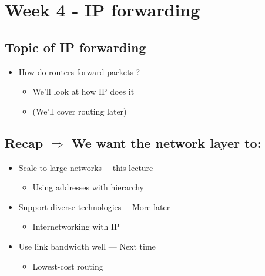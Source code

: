 \documentclass[12pt]{ctexart}   %
\begin{document}
\section{Week 4 - IP forwarding}
	\subsection{Topic of IP forwarding}
	\begin{itemize}
		\item How do routers \underline{forward} packets ?
		\begin{itemize}
			\item We'll look at how IP does it
			\item (We'll cover routing later)
		\end{itemize}
	\end{itemize}
	
	\subsection{Recap $\Rightarrow$ We want the network layer to:}
	\begin{itemize}
		\item Scale to large networks   ---this lecture
		\begin{itemize}
			\item Using addresses with hierarchy
		\end{itemize}
		
		\item {\color{gray} Support diverse technologies ---More later}
		\begin{itemize}
			\item {\color{gray} Internetworking with IP}
		\end{itemize}
		
		\item {\color{gray} Use link bandwidth well --- Next time}
		\begin{itemize}
			\item {\color{gray} Lowest-cost routing}
		\end{itemize}
	\end{itemize}
	
\end{document}
